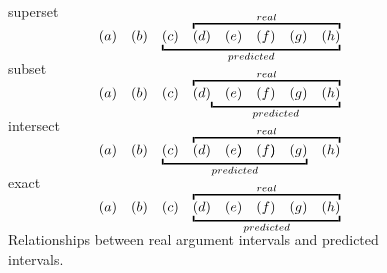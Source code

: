 \begin{figure}[ht]
\centering

superset
\vspace{0.2em}
{\large
\[
\begin{array}{*8{c}}
(a)&(b)&\underscope{predicted}{(c)&\overscope{real}{(d)&(e)&(f)&(g)&(h)}}
\end{array}
\]
}
\vspace{0.5em}

subset
\vspace{0.2em}
{\large
\[
\begin{array}{*8{c}}
(a)&(b)&(c)&\overscope{real}{(d)\underscope{predicted}{&(e)&(f)&(g)&(h)}}
\end{array}
\]
}
\vspace{0.5em}

intersect
\vspace{0.2em}
{\large
\[\def\arraystretch{0.0}
\begin{array}{*8{c}}
(a)&(b)&(c)&\overscope{real}{(d)&(e)&(f)&(g)&(h)}\\[-1em]
\hphantom{(a)}&\hphantom{(b)}&\underscope{predicted}
{\hphantom{(c)}&\hphantom{(d)}&\hphantom{(e})&\hphantom{(f})&
\hphantom{(g)}}&\hphantom{(h)}
\end{array}
\]
}
\vspace{0.5em}

exact
\vspace{0.2em}
{\large
\[
\begin{array}{*8{c}}
(a)&(b)&(c)&\underscope{predicted}{\overscope{real}{(d)&(e)&(f)&(g)&(h)}}
\end{array}
\]
}
\vspace{0.5em}

\caption{\label{i:args-relationship} Relationships between real argument intervals
and predicted intervals. }

\end{figure}
